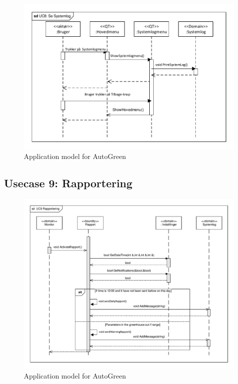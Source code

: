 \begin{figure}[!h]
\centering 
\includegraphics[width={\textwidth-1cm}, trim=0 0 0 0, clip=true] {../fig/SD_autogreen_UC_8_Se_Systemlog.pdf}
\caption{Application model for AutoGreen}
\label{fig:SD_UC8}
\end{figure}

\clearpage

\subsection{Usecase 9: Rapportering}

\begin{figure}[!h]
\centering 
\includegraphics[width={\textwidth-1cm}, trim=0 0 0 0, clip=true] {../fig/SD_autoGreen_UC_9_Rapportering.pdf}
\caption{Application model for AutoGreen}
\label{fig:SD_UC9}
\end{figure}

